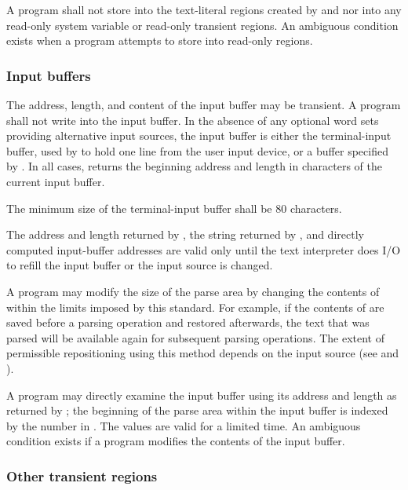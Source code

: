 A program shall not store into the text-literal regions created
by  and  nor into any read-only system variable
or read-only transient regions. An ambiguous condition exists when
a program attempts to store into read-only regions.

\subsubsection{Input buffers} %
\label{usage:inbuf}

The address, length, and content of the input buffer may be
transient. A program shall not write into the input buffer. In the
absence of any optional word sets providing alternative input
sources, the input buffer is either the terminal-input buffer, used
by  to hold one line from the user input device, or a
buffer specified by . In all cases, 
returns the beginning address and length in characters of the
current input buffer.

The minimum size of the terminal-input buffer shall be 80
characters.

The address and length returned by , the string
returned by , and directly computed input-buffer
addresses are valid only until the text interpreter does I/O to
refill the input buffer or the input source is changed.

A program may modify the size of the parse area by changing the
contents of  within the limits imposed by this standard.
For example, if the contents of  are saved before a
parsing operation and restored afterwards, the text that was parsed
will be available again for subsequent parsing operations. The
extent of permissible repositioning using this method depends on the
input source (see 
and ).

A program may directly examine the input buffer using its address
and length as returned by ; the beginning of the parse
area within the input buffer is indexed by the number in .
The values are valid for a limited time. An ambiguous condition
exists if a program modifies the contents of the input buffer.

\subsubsection{Other transient regions} %
\label{usage:transient}

